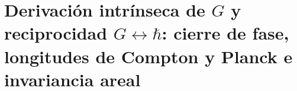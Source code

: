 \chapter{Derivación intrínseca de \(G\) y reciprocidad \(G\leftrightarrow\hbar\): cierre de fase, longitudes de Compton y Planck e invariancia areal}
\label{chap:p3-final:50:gravitacion_accion}



